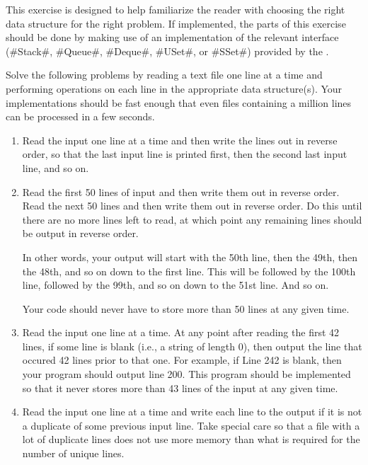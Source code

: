 \begin{exc}
  This exercise is designed to help familiarize the reader with choosing
  the right data structure for the right problem.  If implemented, the
  parts of this exercise should be done by making use of an implementation
  of the relevant interface (#Stack#, #Queue#, #Deque#, #USet#, or #SSet#)
  provided by the .

  Solve the following problems by reading a text file one line at a
  time and performing operations on each line in the appropriate data
  structure(s).  Your implementations should be fast enough that even
  files containing a million lines can be processed in a few seconds.
  \begin{enumerate}
    \item Read the input one line at a time and then write the lines out
      in reverse order, so that the last input line is printed first,
      then the second last input line, and so on.

    \item  Read the first 50 lines of input and then write them out in
      reverse order. Read the next 50 lines and then write them out in
      reverse order. Do this until there are no more lines left to read,
      at which point any remaining lines should be output in reverse
      order.

      In other words, your output will start with the 50th line, then
      the 49th, then the 48th, and so on down to the first line. This
      will be followed by the 100th line, followed by the 99th, and so
      on down to the 51st line. And so on.
      
      Your code should never have to store more than 50 lines at any
      given time.

    \item Read the input one line at a time.
      At any point after reading the first 42 lines, if some line is blank
      (i.e., a string of length 0), then output the line that occured
      42 lines prior to that one. For example, if Line 242 is blank,
      then your program should output line 200. This program should
      be implemented so that it never stores more than 43 lines of the
      input at any given time.

    \item Read the input one line at a time and write each line to the
      output if it is not a duplicate of some previous input line. Take
      special care so that a file with a lot of duplicate lines does not
      use more memory than what is required for the number of unique lines.


\end{enumerate}
\end{exc}
